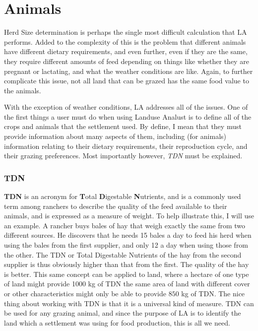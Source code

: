   \section{Animals}
  Herd Size determination is perhaps the single most difficult calculation that LA
performs.  Added to the complexity of this is the problem that different animals have different dietary requirements, and even further, even if they are the same, they require different amounts of feed depending on things like whether they are pregnant or lactating, and what the weather conditions are like.  Again, to further complicate this issue, not all land that can be grazed has the same food value to the animals.

  With the exception of weather conditions, LA addresses all of the issues.  One of the first things a user must do when using
Landuse Analust is to define all of the crops and animals that the settlement used.  By define, I mean that they must provide information about many aspects of them, including (for animals) information relating to their dietary requirements, their reproduction cycle, and their grazing preferences.  Most importantly however, \textit{TDN} must be explained.

    \subsubsection{TDN}
      \label{TDN}
    \textbf{TDN} is an acronym for \textbf{T}otal \textbf{D}igestable \textbf{N}utrients, and is a commonly used term among ranchers to describe the quality of the feed available to their animals, and is expressed as a measure of weight.  To help illustrate this, I will use an example.  A rancher buys bales of hay that weigh exactly the same from two different sources.  He discovers that he needs 15 bales a day to feed his herd when using the bales from the first supplier, and only 12 a day when using those from the other.  The TDN or Total Digestable Nutrients of the hay from the second supplier is thus obviously higher than that from the first.  The quality of the hay is better.  This same concept can be applied to land, where a hectare of one type of land might provide 1000 kg of TDN the same area of land with different cover or other characteristics might only be able to provide $850$ kg of TDN.  The nice thing about working with TDN is that it is a universal kind of measure.  TDN can be used for any grazing animal, and since the purpose of LA is to identify the land which a settlement was using for food production, this is all we need.


